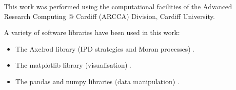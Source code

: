\documentclass[10pt,letterpaper]{article}
\begin{document}
This work was performed using the computational facilities of the Advanced
Research Computing @ Cardiff (ARCCA) Division, Cardiff University.

A variety of software libraries have been used in this work:

\begin{itemize}
    \item The Axelrod library (IPD strategies and Moran processes)
        \cite{axelrodproject}.
    \item The matplotlib library (visualisation) \cite{hunter2007matplotlib}.
    \item The pandas and numpy libraries (data manipulation)
        \cite{mckinney2010data, walt2011numpy}.
\end{itemize}

\nolinenumbers
\end{document}
